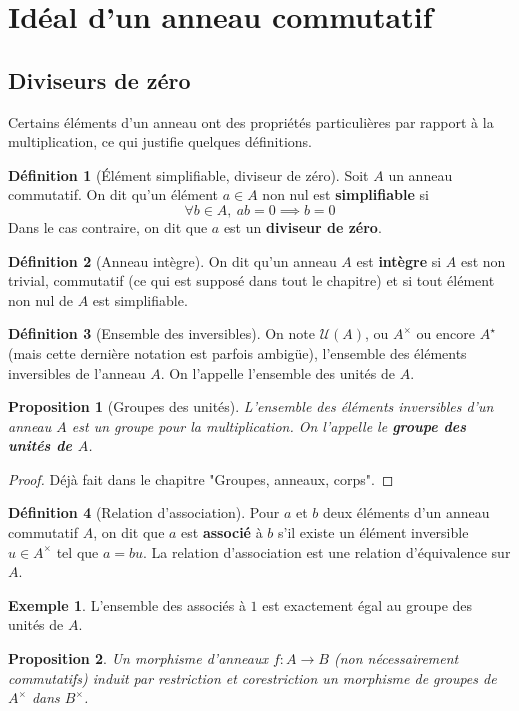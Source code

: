 \documentclass[french]{book}
\newcommand{\st}{^\star}
\theoremstyle{plain}
\newtheorem{prop}{Proposition}[chapter]
\theoremstyle{definition}
\newtheorem{dfn}{Définition}[chapter]
\newtheorem{exa}{Exemple}[chapter]
\theoremstyle{remark}
\begin{document}
\section{Idéal d'un anneau commutatif}
\subsection{Diviseurs de zéro}
Certains éléments d'un anneau ont des propriétés particulières par rapport à la multiplication, ce qui justifie quelques définitions.
\begin{dfn}[Élément simplifiable, diviseur de zéro]
	Soit $A$ un anneau commutatif. On dit qu'un élément $a\in A$ non nul est \textbf{simplifiable} si $$\forall b\in A,\ ab=0\implies b=0$$ Dans le cas contraire, on dit que $a$ est un \textbf{diviseur de zéro}.
\end{dfn}
\begin{dfn}[Anneau intègre]
	On dit qu'un anneau $A$ est \textbf{intègre} si $A$ est non trivial, commutatif (ce qui est supposé dans tout le chapitre) et si tout élément non nul de $A$ est simplifiable.
\end{dfn}
\begin{dfn}[Ensemble des inversibles]
	On note $\mathcal{U}(A)$, ou $A^\times$ ou encore $A\st$ (mais cette dernière notation est parfois ambigüe), l'ensemble des éléments inversibles de l'anneau $A$. On l'appelle l'ensemble des unités de $A$.
\end{dfn}
\begin{prop}[Groupes des unités]
	L'ensemble des éléments inversibles d'un anneau $A$ est un groupe pour la multiplication. On l'appelle le \textbf{groupe des unités de $A$}.
\end{prop}
\begin{proof}
	Déjà fait dans le chapitre "Groupes, anneaux, corps".
\end{proof}
\begin{dfn}[Relation d'association]
	Pour $a$ et $b$ deux éléments d'un anneau commutatif $A$, on dit que $a$ est \textbf{associé} à $b$ s'il existe un élément inversible $u\in A^\times$ tel que $a=bu$. La relation d'association est une relation d'équivalence sur $A$.
\end{dfn}
\begin{exa}
	L'ensemble des associés à $1$ est exactement égal au groupe des unités de $A$.
\end{exa}
\begin{prop}
	Un morphisme d'anneaux $f:A\rightarrow B$ (non nécessairement commutatifs) induit par restriction et corestriction un morphisme de groupes de $A^\times$ dans $B^\times$.
\end{prop}
\end{document}
